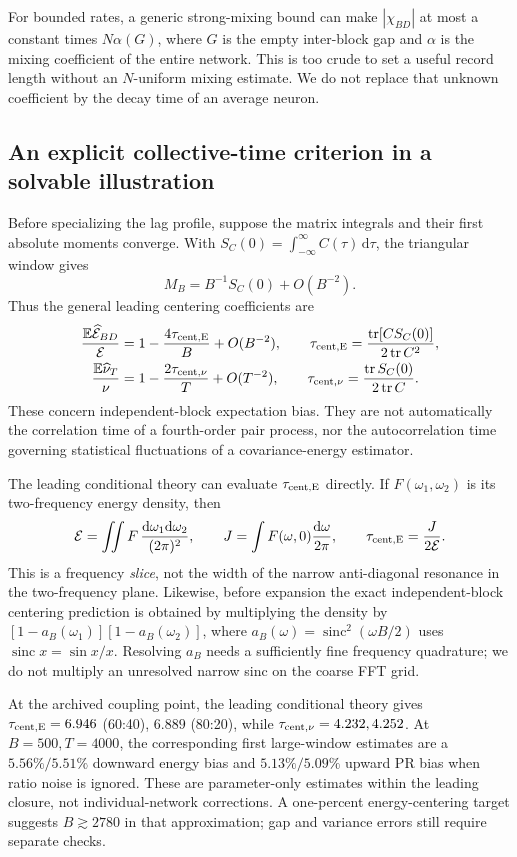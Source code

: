 For bounded rates, a generic strong-mixing bound can make $|\chi_{BD}|$ at
most a constant times $N\alpha(G)$, where $G$ is the empty inter-block gap and
$\alpha$ is the mixing coefficient of the entire network. This is too crude
to set a useful record length without an $N$-uniform mixing estimate. We do
not replace that unknown coefficient by the decay time of an average neuron.

\subsection{An explicit collective-time criterion in a solvable illustration}
Before specializing the lag profile, suppose the matrix integrals and their
first absolute moments converge. With $S_C(0)=\int_{-\infty}^{\infty}C(\tau)
\,\mathrm d\tau$, the triangular window gives
\[
 M_B=B^{-1}S_C(0)+O(B^{-2}).
\]
Thus the general leading centering coefficients are
\begin{align*}
 \frac{\mathbb E\widehat{\mathcal E}_{BD}}{\mathcal E}
 &=1-\frac{4\tau_{\rm cent,E}}B+O(B^{-2}),\qquad
 \tau_{\rm cent,E}=\frac{\operatorname{tr}[C S_C(0)]}
                         {2\operatorname{tr}C^2},\\
 \frac{\mathbb E\widehat\nu_T}{\nu}
 &=1-\frac{2\tau_{\rm cent,\nu}}T+O(T^{-2}),\qquad
 \tau_{\rm cent,\nu}=\frac{\operatorname{tr}S_C(0)}{2\operatorname{tr}C}.
\end{align*}
These concern independent-block expectation bias. They are not automatically
the correlation time of a fourth-order pair process, nor the autocorrelation
time governing statistical fluctuations of a covariance-energy estimator.

The leading conditional theory can evaluate $\tau_{\rm cent,E}$ directly.
If $F(\omega_1,\omega_2)$ is its two-frequency energy density, then
\[
 \mathcal E=\iint F\,\frac{\mathrm d\omega_1\mathrm d\omega_2}{(2\pi)^2},
 \qquad J=\int F(\omega,0)\frac{\mathrm d\omega}{2\pi},\qquad
 \tau_{\rm cent,E}=\frac{J}{2\mathcal E}.
\]
This is a frequency \emph{slice}, not the width of the narrow anti-diagonal
resonance in the two-frequency plane. Likewise, before expansion the exact
independent-block centering prediction is obtained by multiplying the density
by $[1-a_B(\omega_1)][1-a_B(\omega_2)]$, where
$a_B(\omega)=\operatorname{sinc}^2(\omega B/2)$ uses $\operatorname{sinc}x=
\sin x/x$. Resolving $a_B$ needs a sufficiently fine frequency quadrature;
we do not multiply an unresolved narrow sinc on the coarse FFT grid.

At the archived coupling point, the leading conditional theory gives
$\tau_{\rm cent,E}=6.946$ (60:40), $6.889$ (80:20), while
$\tau_{\rm cent,\nu}=4.232,4.252$. At $B=500,T=4000$, the corresponding
first large-window estimates are a $5.56\%/5.51\%$ downward energy bias
and $5.13\%/5.09\%$ upward PR bias when ratio noise is ignored. These are
parameter-only estimates within the leading closure, not individual-network
corrections. A one-percent energy-centering target suggests $B\gtrsim2780$
in that approximation; gap and variance errors still require separate checks.

